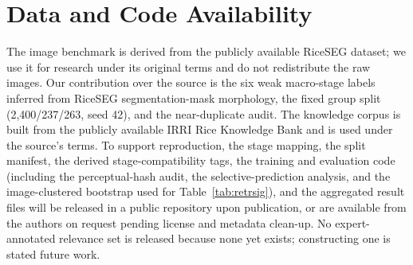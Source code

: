 \documentclass{llncs}
\begin{document}
\section{Data and Code Availability}
\label{sec:availability}

The image benchmark is derived from the publicly available RiceSEG dataset; we use it for research under its original terms and do not redistribute the raw images. Our contribution over the source is the six weak macro-stage labels inferred from RiceSEG segmentation-mask morphology, the fixed group split (2{,}400/237/263, seed 42), and the near-duplicate audit. The knowledge corpus is built from the publicly available IRRI Rice Knowledge Bank and is used under the source's terms. To support reproduction, the stage mapping, the split manifest, the derived stage-compatibility tags, the training and evaluation code (including the perceptual-hash audit, the selective-prediction analysis, and the image-clustered bootstrap used for Table~\ref{tab:retrsig}), and the aggregated result files will be released in a public repository upon publication, or are available from the authors on request pending license and metadata clean-up. No expert-annotated relevance set is released because none yet exists; constructing one is stated future work.



\end{document}
